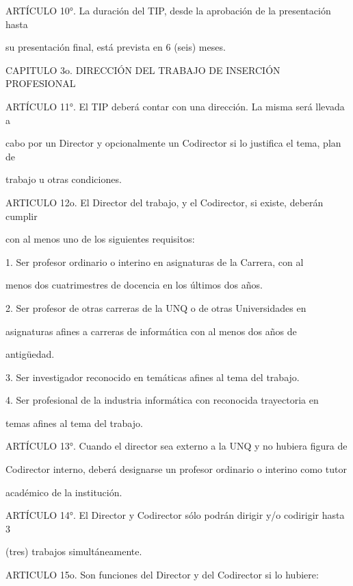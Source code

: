 \documentclass[a4paper,12pt]{article}
\begin{document}
ARTÍCULO 10°. La duración del TIP, desde la aprobación de la presentación hasta

su presentación final, está prevista en 6 (seis) meses. 

CAPITULO 3o. DIRECCIÓN DEL TRABAJO DE INSERCIÓN PROFESIONAL

ARTÍCULO 11°. El TIP deberá contar con una dirección. La misma será llevada a

cabo por un Director y opcionalmente un Codirector si lo justifica el tema, plan de

trabajo u otras condiciones.

ARTICULO 12o. El Director del trabajo, y el Codirector, si existe, deberán cumplir

con al menos uno de los siguientes requisitos:

1. Ser profesor ordinario o interino en asignaturas de la Carrera, con al

menos dos cuatrimestres de docencia en los últimos dos años.

2. Ser profesor de otras carreras de la UNQ o de otras Universidades en

asignaturas afines a carreras de informática con al menos dos años de

antigüedad.

3. Ser investigador reconocido en temáticas afines al tema del trabajo.

4. Ser profesional de la industria informática con reconocida trayectoria en

temas afines al tema del trabajo.

ARTÍCULO 13°. Cuando el director sea externo a la UNQ y no hubiera figura de

Codirector interno, deberá designarse un profesor ordinario o interino como tutor

académico de la institución.

ARTÍCULO 14°. El Director y Codirector sólo podrán dirigir y/o codirigir hasta 3

(tres) trabajos simultáneamente. 

ARTICULO 15o. Son funciones del Director y del Codirector si lo hubiere:
\end{document}
